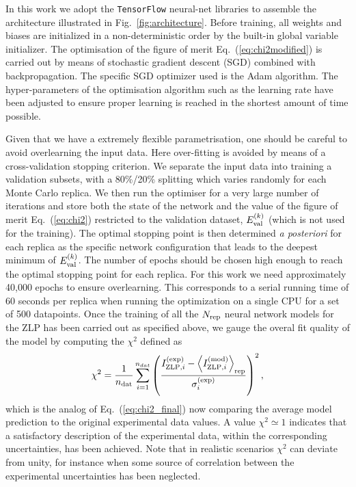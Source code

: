 In this work we adopt the {\tt TensorFlow} neural-net libraries to assemble
the architecture illustrated in  Fig.~\ref{fig:architecture}.
%
Before training, all weights and biases are initialized in a non-deterministic order
by the built-in global variable initializer. 
%
The optimisation of the figure of merit Eq.~(\ref{eq:chi2modified}) is carried
out by means of stochastic gradient descent (SGD) combined with backpropagation. The
specific SGD optimizer used is the Adam algorithm.
%
The hyper-parameters of the optimisation algorithm such as the learning rate
have been adjusted to ensure proper learning is reached in the shortest amount
of time possible.
%

Given that we have a extremely flexible parametrisation, one should be careful
to avoid overlearning the input data.
%
Here over-fitting is avoided by means of a cross-validation stopping criterion.
%
We separate the input data into training a validation subsets, with a 80\%/20\% splitting
which varies randomly for each Monte Carlo replica.
%
We then run the optimiser for a very large number of iterations and store both
the state of the network and the value
of the figure of merit Eq.~(\ref{eq:chi2}) restricted to the validation
dataset, $E^{(k)}_{\rm val}$ (which is not used for the training).
%
The optimal stopping point is then determined {\it a posteriori} for each replica
as the specific network configuration that leads to the deepest minimum of $E^{(k)}_{\rm val}$.
%
The number of epochs should be chosen high enough to reach the optimal stopping point for each replica.
For this work we need approximately 40,000 epochs to ensure overlearning.
%
This corresponds to a serial running time of 60 seconds per replica when running the optimization on a 
single CPU for a set of 500 datapoints.
%
Once the training of all the $N_{\rm rep}$ neural network models for the ZLP has been carried
out as specified above, we gauge the overal fit quality of the model by computing the
$\chi^2$ defined as
\begin{equation}
  \label{eq:chi2_final}
\begin{centering}
  \chi^2 = \frac{1}{n_{\rm dat}}\sum_{i=1}^{n_{dat}}\left(\frac{ I_{{\rm ZLP},i}^{{\rm (exp)}} -
 \la I_{{\rm ZLP},i}^{{\rm (mod)}}\ra_{\rm rep} }{\sigma_i^{(\rm exp)}}\right)^2, 
\end{centering}
\end{equation}
which is the analog of Eq.~(\ref{eq:chi2_final}) now comparing the average model prediction
to the original experimental data values.
%
A value $\chi^2 \simeq 1$ indicates that a satisfactory description of the experimental data,
within the corresponding uncertainties, has been achieved.
%
Note that in realistic scenarios $\chi^2$ can deviate from unity, for instance when
some source of correlation between the experimental uncertainties has been neglected.

